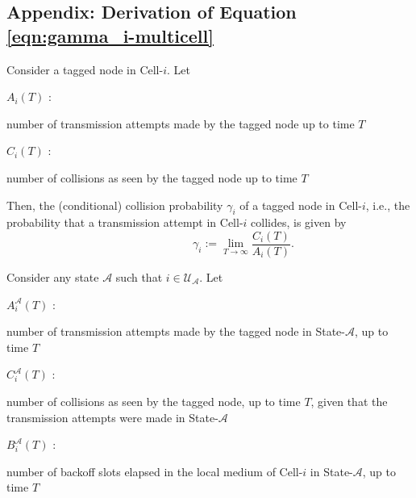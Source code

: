 \documentclass[10pt,a4paper,journal]{IEEEtran}
\theoremstyle{definition}
\theoremstyle{remark}
\theoremstyle{plain}
\begin{document}
\appendix


\subsection{Appendix: Derivation of Equation \eqref{eqn:gamma_i-multicell}} 
\label{app:derivation-eqn-gamma_i}

Consider a tagged node in Cell-$i$. Let

\vspace{1mm}

$A_i(T)$ : \parbox[t]{6cm}{number of transmission attempts made by the tagged node up to time $T$}

\vspace{1mm}

$C_i(T)$ : \parbox[t]{6cm}{number of collisions as seen by the tagged node up to time $T$} 

\vspace{1mm}


Then, the (conditional) collision probability $\gamma_i$ of a tagged node in Cell-$i$, i.e., the probability that a transmission attempt in Cell-$i$ collides, is given by
\begin{equation}
\label{eqn:gamma-definition}
\quad \quad \quad \quad \quad \quad \gamma_i := \displaystyle \lim_{T \longrightarrow \infty} \frac{C_i(T)}{A_i(T)}.
\end{equation}






Consider any state $\mathcal{A}$ such that $i \in \mathcal{U}_{\mathcal{A}}$. Let 

\vspace{1mm}

$A_i^{\mathcal{A}}(T)$ : \parbox[t] {6cm} {number of transmission attempts made by the tagged node in State-$\mathcal{A}$, up to time $T$} 

\vspace{1mm}

$C_i^{\mathcal{A}}(T)$ : \parbox[t] {6cm} {number of collisions as seen by the tagged node, up to time $T$, given that the transmission attempts were made in State-${\mathcal{A}}$}

\vspace{1mm}

$B_i^{\mathcal{A}}(T)$ : \parbox[t] {6cm} {number of backoff slots elapsed in the local medium of Cell-$i$ in State-${\mathcal{A}}$, up to time $T$}

\vspace{1mm}
\end{document}
